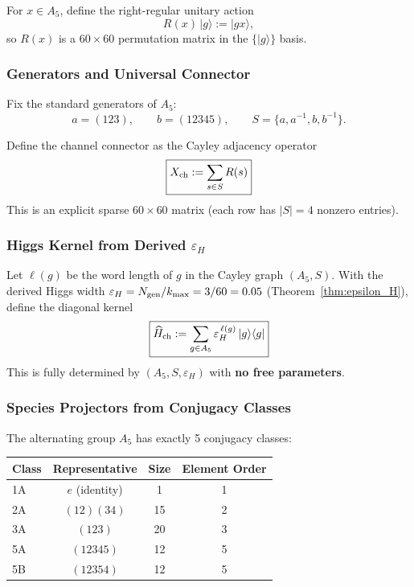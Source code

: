 For $x \in A_5$, define the right-regular unitary action
\begin{equation}
R(x)\,|g\rangle := |gx\rangle,
\end{equation}
so $R(x)$ is a $60 \times 60$ permutation matrix in the $\{|g\rangle\}$ basis.

\subsubsection{Generators and Universal Connector}

Fix the standard generators of $A_5$:
\begin{equation}
a = (123), \qquad b = (12345), \qquad S = \{a, a^{-1}, b, b^{-1}\}.
\end{equation}

Define the channel connector as the Cayley adjacency operator
\begin{equation}
\boxed{X_{\rm ch} := \sum_{s \in S} R(s)}
\end{equation}
This is an explicit sparse $60 \times 60$ matrix (each row has $|S| = 4$ nonzero entries).

\subsubsection{Higgs Kernel from Derived $\varepsilon_H$}

Let $\ell(g)$ be the word length of $g$ in the Cayley graph $(A_5, S)$.
With the derived Higgs width $\varepsilon_H = N_{\rm gen}/k_{\max} = 3/60 = 0.05$ 
(Theorem~\ref{thm:epsilon_H}), define the diagonal kernel
\begin{equation}
\boxed{\widehat{H}_{\rm ch} := \sum_{g \in A_5} \varepsilon_H^{\,\ell(g)}\,|g\rangle\langle g|}
\end{equation}
This is fully determined by $(A_5, S, \varepsilon_H)$ with \textbf{no free parameters}.

\subsubsection{Species Projectors from Conjugacy Classes}

The alternating group $A_5$ has exactly 5 conjugacy classes:

\begin{center}
\renewcommand{\arraystretch}{1.3}
\begin{tabular}{lccc}
\toprule
Class & Representative & Size & Element Order \\
\midrule
1A & $e$ (identity) & 1 & 1 \\
2A & $(12)(34)$ & 15 & 2 \\
3A & $(123)$ & 20 & 3 \\
5A & $(12345)$ & 12 & 5 \\
5B & $(12354)$ & 12 & 5 \\
\bottomrule
\end{tabular}
\end{center}

